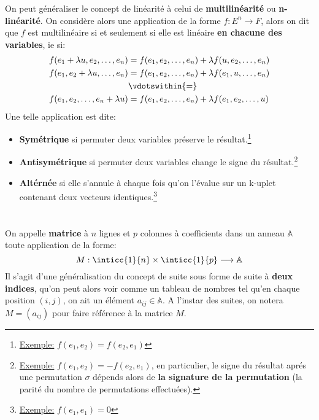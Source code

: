 On peut généraliser le concept de linéarité à celui de \textbf{multilinéarité} ou \textbf{n-linéarité}. On considère alors une application de la forme \(f : E^n \longrightarrow F\), alors on dit que \(f\) est multilinéaire si et seulement si elle est linéaire \textbf{en chacune des variables}, ie si:
\begin{align*}
   f(e_1 + \lambda u, e_2, \ldots, e_n) &= f(e_1, e_2, \ldots, e_n) + \lambda f(u, e_2, \ldots, e_n)  \\
   f(e_1, e_2  + \lambda u, \ldots, e_n) &= f(e_1, e_2, \ldots, e_n) + \lambda f(e_1, u, \ldots, e_n) \\
   & \vdotswithin{=} \\   
   f(e_1, e_2 , \ldots, e_n + \lambda u) &= f(e_1, e_2, \ldots, e_n) + \lambda f(e_1, e_2, \ldots, u)
\end{align*}
Une telle application est dite:
\begin{itemize}
   \item \textbf{Symétrique} si permuter deux variables préserve le résultat.\footnote[1]{\underline{Exemple:} \(f(e_1, e_2) = f(e_2, e_1)\)}
   \item \textbf{Antisymétrique} si permuter deux variables change le signe du résultat.\footnote[2]{\underline{Exemple:} \(f(e_1, e_2) = -f(e_2, e_1)\), en particulier, le signe du résultat aprés une permutation \(\sigma\) dépends alors de \textbf{la signature de la permutation} (la parité du nombre de permutations effectuées).}
   \item  \textbf{Altérnée} si elle s'annule à chaque fois qu'on l'évalue sur un k-uplet contenant deux vecteurs identiques.\footnote[3]{\underline{Exemple:} \(f(e_1, e_1) = 0\)}
\end{itemize}
\chapter*{} %

On appelle \textbf{matrice} à \(n\) lignes et \(p\) colonnes à coefficients dans un anneau \(\mathbb{A}\) toute application de la forme:
\[
   M : \inticc{1}{n} \times \inticc{1}{p} \longrightarrow \mathbb{A}
\]
Il s'agit d'une généralisation du concept de suite sous forme de suite à \textbf{deux indices}, qu'on peut alors voir comme un tableau de nombres tel qu'en chaque position \((i, j)\), on ait un élément \(a_{ij} \in \mathbb{A}\). A l'instar des suites, on notera \(M = (a_{ij})\) pour faire référence à la matrice \(M\).\<

